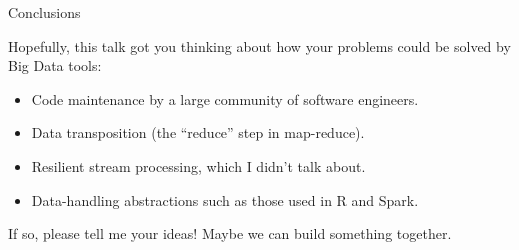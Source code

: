 \documentclass{beamer}
\begin{document}
\begin{frame}{Conclusions}

Hopefully, this talk got you thinking about how your problems could be solved by Big Data tools:
\begin{itemize}
\item Code maintenance by a large community of software engineers.
\item Data transposition (the ``reduce'' step in map-reduce).
\item Resilient stream processing, which I didn't talk about.
\item Data-handling abstractions such as those used in R and Spark.
\end{itemize}

\vfill
If so, please tell me your ideas! Maybe we can build something together.
\end{frame}
\end{document}
